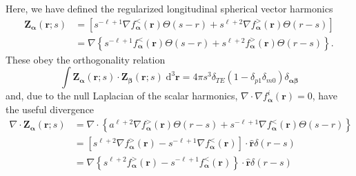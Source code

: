 \documentclass{article}
\begin{document}
Here, we have defined the regularized longitudinal spherical vector harmonics 
\begin{equation}\label{eq:regularizedLongitudinalHarmonics}
\begin{split}
\mathbf{Z}_{\bm{\alpha}}(\mathbf{r};s) &= \left[s^{-\ell + 1}\nabla f_{\bm{\alpha}}^<(\mathbf{r})\Theta(s - r) + s^{\ell + 2}\nabla f_{\bm{\alpha}}^>(\mathbf{r})\Theta(r - s)\right]\\
&= \nabla\left\{s^{-\ell + 1} f_{\bm{\alpha}}^<(\mathbf{r})\Theta(s - r) + s^{\ell + 2} f_{\bm{\alpha}}^>(\mathbf{r})\Theta(r - s)\right\}.
\end{split}
\end{equation}
These obey the orthogonality relation
\begin{equation}
\int\mathbf{Z}_{\bm{\alpha}}(\mathbf{r};s)\cdot\mathbf{Z}_{\bm{\beta}}(\mathbf{r};s)\;\mathrm{d}^3\mathbf{r} = 4\pi s^3\delta_{TE}(1 - \delta_{p1}\delta_{m0})\delta_{\bm{\alpha}\bm{\beta}}
\end{equation}
and, due to the null Laplacian of the scalar harmonics, $\nabla\cdot\nabla f_{\bm{\alpha}}^i(\mathbf{r}) = 0$, have the useful divergence
\begin{equation}
\begin{split}
\nabla\cdot\mathbf{Z}_{\bm{\alpha}}(\mathbf{r};s) &= \nabla\cdot\left\{a^{\ell + 2}\nabla f_{\bm{\alpha}}^>(\mathbf{r})\Theta(r - s) + s^{-\ell + 1}\nabla f_{\bm{\alpha}}^<(\mathbf{r})\Theta(s - r)\right\}\\[0.5em]
&= \left[s^{\ell + 2}\nabla f_{\bm{\alpha}}^>(\mathbf{r}) - s^{-\ell + 1}\nabla f_{\bm{\alpha}}^<(\mathbf{r})\right]\cdot\hat{\mathbf{r}}\delta(r - s)\\
&= \nabla\left\{s^{\ell + 2} f_{\bm{\alpha}}^>(\mathbf{r}) - s^{-\ell + 1} f_{\bm{\alpha}}^<(\mathbf{r})\right\}\cdot\hat{\mathbf{r}}\delta(r - s)
\end{split}
\end{equation}
\end{document}
